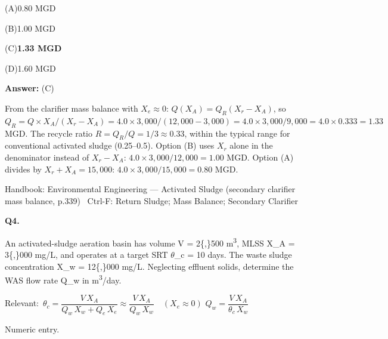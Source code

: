 \documentclass[11pt]{article}
\newcommand{\correct}[1]{\textbf{#1}\;{\color{accent}$\checkmark$}}
\newcommand{\optline}[2]{\par\noindent\hspace{1.2em}(#1)\hspace{0.6em}#2}
\begin{document}
\optline{A}{0.80 MGD}
\optline{B}{1.00 MGD}
\optline{C}{\correct{1.33 MGD}}
\optline{D}{1.60 MGD}
\par\vspace{3pt}
\vspace{2pt}\par\noindent\colorbox{boxbg}{\parbox{\dimexpr\linewidth-2\fboxsep\relax}{%
\vspace{2pt}\textbf{Answer:} (C)\par\vspace{2pt}
{\small From the clarifier mass balance with $X_e\approx0$: $Q(X_A) = Q_R(X_r-X_A)$, so $Q_R = Q\times X_A/(X_r-X_A) = 4.0\times3{,}000/(12{,}000-3{,}000) = 4.0\times3{,}000/9{,}000 = 4.0\times0.333 = 1.33$ MGD. The recycle ratio $R = Q_R/Q = 1/3 \approx 0.33$, within the typical range for conventional activated sludge (0.25--0.5). Option (B) uses $X_r$ alone in the denominator instead of $X_r-X_A$: $4.0\times3{,}000/12{,}000 = 1.00$ MGD. Option (A) divides by $X_r+X_A = 15{,}000$: $4.0\times3{,}000/15{,}000 = 0.80$ MGD.}\par\vspace{2pt}
{\footnotesize\color{soft}Handbook: Environmental Engineering --- Activated Sludge (secondary clarifier mass balance, p.339) \textbullet\ Ctrl-F: Return Sludge; Mass Balance; Secondary Clarifier}\vspace{2pt}
}}
\vspace{9pt}
\filbreak
\textbf{\color{accent}Q4.}\par\vspace{2pt}
An activated-sludge aeration basin has volume V = 2\{,\}500 m\textsuperscript{3}, MLSS X\_A = 3\{,\}000 mg/L, and operates at a target SRT $\theta$\_c = 10 days. The waste sludge concentration X\_w = 12\{,\}000 mg/L. Neglecting effluent solids, determine the WAS flow rate Q\_w in m\textsuperscript{3}/day.\par\vspace{3pt}
{\small\color{soft}Relevant:}\ $\theta_c = \dfrac{V\,X_A}{Q_w\,X_w + Q_e\,X_e}\approx\dfrac{V\,X_A}{Q_w\,X_w}\quad(X_e\approx 0)$ \quad $Q_w = \dfrac{V\,X_A}{\theta_c\,X_w}$\par\vspace{3pt}
{\small\color{soft}Numeric entry.}\par\vspace{3pt}
\end{document}
